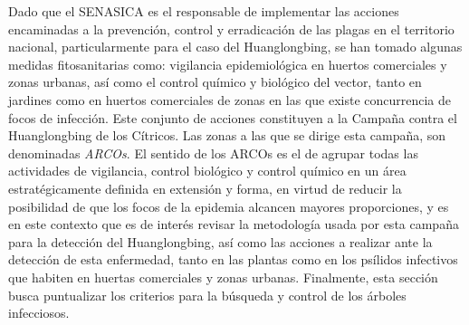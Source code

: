 Dado que el SENASICA es el responsable de implementar las acciones encaminadas a la prevención, control y erradicación de las plagas en el territorio nacional, particularmente para el caso del Huanglongbing, se han tomado algunas medidas fitosanitarias como: vigilancia epidemiológica en huertos comerciales y zonas urbanas, así como el control químico y biológico del vector, tanto en jardines como en huertos comerciales de zonas en las que existe concurrencia de focos de infección. Este conjunto de acciones constituyen a la Campaña contra el Huanglongbing de los Cítricos. Las zonas a las que se dirige esta campaña, son denominadas \textit{ARCOs}. El sentido de los ARCOs es el de agrupar todas las actividades de vigilancia, control biológico y control químico en un área estratégicamente definida en extensión y forma, en virtud de reducir la posibilidad de que los focos de la epidemia alcancen mayores proporciones, y es en este contexto que es de interés revisar la metodología usada por esta campaña para la detección del Huanglongbing, así como las acciones a realizar ante la detección de esta enfermedad, tanto en las plantas como en los psílidos infectivos que habiten en huertas comerciales y zonas urbanas. Finalmente, esta sección busca puntualizar los criterios para la búsqueda y control de los árboles infecciosos.


